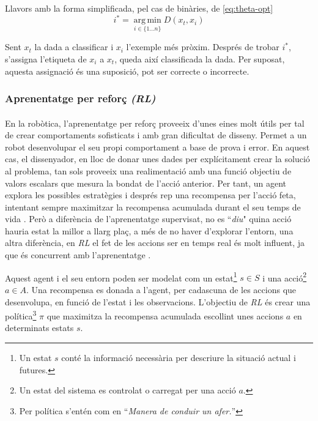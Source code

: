 \documentclass[12pt,a4paper,final,twoside]{article}
\begin{document}
Llavors amb la forma simplificada, pel cas de binàries, de \eqref{eq:theta-opt}
\begin{equation} \label{eq:theta-opt-exemple}
i^*=\operatorname*{arg\,min}_{i\in\{1\dots n\}} D(x_{t}, x_{i})
\end{equation}

Sent $x_{t}$ la dada a classificar i $x_{i}$ l'exemple més pròxim. Després de trobar $i^*$, s'assigna l'etiqueta de $x_{i}$ a $x_{t}$, queda així classificada la dada. Per suposat, aquesta assignació és una suposició, pot ser correcte o incorrecte.


\subsubsection{Aprenentatge per reforç \textit{(RL)}}
\label{RL-estat-de-l'art}

\paragraph{}En la robòtica, l'aprenentatge per reforç proveeix d'unes eines molt útils per tal de crear comportaments sofisticats i amb gran dificultat de disseny. Permet a un robot desenvolupar el seu propi comportament a base de prova i error. En aquest cas, el dissenyador, en lloc de donar unes dades per explícitament crear la solució al problema, tan sols proveeix una realimentació amb una funció objectiu de valors escalars que mesura la bondat de l'acció anterior. Per tant, un agent explora les possibles estratègies i després rep una recompensa per l'acció feta, intentant sempre maximitzar la recompensa acumulada durant el seu temps de vida \cite{Kober2009}. Però a diferència de l'aprenentatge supervisat, no es ``\textit{diu}"  quina acció hauria estat la millor a llarg plaç, a més de no haver d'explorar l'entorn, una altra diferència, en \textit{RL} el fet de les accions ser en temps real és molt influent, ja que és concurrent amb l'aprenentatge \cite{Kaelbling1996}. 

Aquest agent i el seu entorn poden ser modelat com un estat\footnote{Un estat $s$ conté la informació necessària per descriure la situació actual i futures.}  $s\in S $ i una acció\footnote{Un estat del sistema es controlat o carregat per una acció $a$.}  $a \in A$. Una recompensa es donada a l'agent, per cadascuna de les accions que desenvolupa, en funció de l'estat i les observacions. L'objectiu de \textit{RL} és crear una política\footnote{Per política s'entén com en \cite{iec-dlc} ``\textit{Manera de conduir un afer.}''} $\pi$ que maximitza la recompensa acumulada escollint unes accions $a$ en determinats estats $s$.
\end{document}
